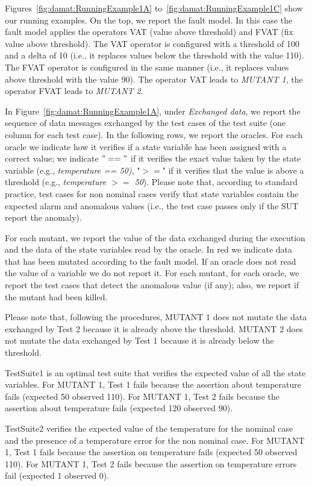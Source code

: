 Figures~\ref{fig:damat:RunningExample1A} to~\ref{fig:damat:RunningExample1C} show our running examples. On the top, we report the fault model. In this case the fault model applies the operators VAT (value above threshold) and FVAT (fix value above threshold). The VAT operator is configured with a threshold of 100 and a delta of 10 (i.e., it replaces values below the threshold with the value 110). The FVAT operator is configured in the same manner (i.e., it replaces values above threshold with the value 90). The operator VAT leads to \emph{MUTANT 1}, the operator FVAT leads to \emph{MUTANT 2}.

In Figure~\ref{fig:damat:RunningExample1A}, under \emph{Exchanged data}, we report the sequence of data messages exchanged by the test cases of the test suite (one column for each test case).
In the following rows, we report the oracles. For each oracle we indicate how it verifies if a state variable has been assigned with a correct value; we indicate $"=="$ if it verifies the exact value taken by the state variable (e.g., \emph{temperature == 50)}, "$>=$" if it verifies that the value is above a threshold (e.g., \emph{temperature $>=$ 50}). Please note that, according to standard practice, test cases for non nominal cases verify that state variables contain the expected alarm and anomalous values (i.e., the test case passes only if the SUT report the anomaly). 

For each mutant, we report the value of the data exchanged during the execution and the data of the state variables read by the oracle. In red we indicate data that has been mutated according to the fault model. 
If an oracle does not read the value of a variable we do not report it.
For each mutant, for each oracle, we report the test cases that detect the anomalous value (if any); also, we report if the mutant had been killed.

Please note that, following the \APPR procedures, MUTANT 1 does not mutate the data exchanged by Test 2 because it is already above the threshold. MUTANT 2 does not mutate the data exchanged by Test 1 because it is already below the threshold.

TestSuite1 is an optimal test suite that verifies the expected value of all the state variables. For MUTANT 1, Test 1 fails because the assertion about temperature fails (expected 50 observed 110).
For MUTANT 1, Test 2 fails because the assertion about temperature fails (expected 120 observed 90).

TestSuite2 verifies the expected value of the temperature for the nominal case and the presence of a temperature error for the non nominal case. For MUTANT 1, Test 1 fails because the assertion on temperature fails (expected 50 observed 110).
For MUTANT 1, Test 2 fails because the assertion on temperature errors fail (expected 1 observed 0).

